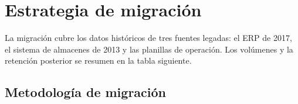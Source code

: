 \section{Estrategia de migración}
\label{sec:migracion}

La migración cubre los datos históricos de tres fuentes legadas: el ERP de
2017, el sistema de almacenes de 2013 y las planillas de operación.  Los
volúmenes y la retención posterior se resumen en la tabla siguiente.


\subsection{Metodología de migración}
\label{sec:migracion-metodologia}

